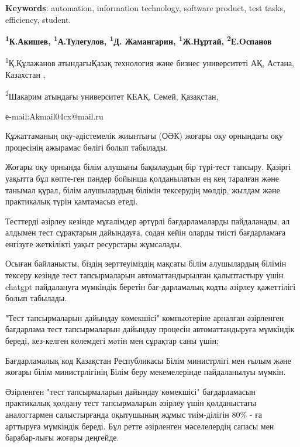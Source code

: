 {\bfseries Keywords}: automation, information technology, software
product, test tasks, efficiency, student.




\begin{center}
{\bfseries \textsuperscript{1}К.Акишев\envelope,
\textsuperscript{1}А.Тулегулов, \textsuperscript{1}Д. Жамангарин,
\textsuperscript{1}Ж.Нұртай, \textsuperscript{2}Е.Oспанов}

\textsuperscript{1}Қ.Құлажанов атындағыҚазақ технология және бизнес
университеті АҚ, Астана, Казахстан ,

\textsuperscript{2}Шакарим атындағы университет КЕАҚ, Семей, Қазақстан,

е-mail:Akmail04cx@mail.ru
\end{center}

Құжаттаманың оқу-әдістемелік жиынтығы (ОӘК) жоғары оқу орнындағы оқу
процесінің ажырамас бөлігі болып табылады.

Жоғары оқу орнында білім алушыны бақылаудың бір түрі-тест тапсыру.
Қазіргі уақытта бұл көпте-ген пәндер бойынша қолданылатын ең кең таралған
және танымал құрал, білім алушылардың білімін тексерудің мөлдір, жылдам
және практикалық түрін қамтамасыз етеді.

Тесттерді әзірлеу кезінде мұғалімдер әртүрлі бағдарламаларды
пайдаланады, ал алдымен тест сұрақтарын дайындауға, содан кейін оларды
тиісті бағдарламаға енгізуге жеткілікті уақыт ресурстары жұмсалады.

Осыған байланысты, біздің зерттеуіміздің мақсаты білім алушылардың
білімін тексеру кезінде тест тапсырмаларын автоматтандырылған
қалыптастыру үшін chatgpt пайдалануға мүмкіндік беретін бағ-дарламалық
кодты әзірлеу қажеттілігі болып табылады.

"Тест тапсырмаларын дайындау көмекшісі" компьютеріне арналған әзірленген
бағдарлама тест тапсырмаларын дайындау процесін автоматтандыруға
мүмкіндік береді, кез-келген көлемдегі мәтін мен сұрақтар саны үшін;

Бағдарламалық код Қазақстан Республикасы Білім министрлігі мен ғылым
және жоғары білім министрлігінің Білім беру мекемелерінде пайдаланылуы
мүмкін.

Әзірленген "тест тапсырмаларын дайындау көмекшісі" бағдарламасын
практикалық қолдану тест тапсырмаларын әзірлеу үшін қолданыстағы
аналогтармен салыстырғанда оқытушының жұмыс тиім-ділігін 80\% - ға
арттыруға мүмкіндік береді. Бұл ретте әзірленген мәселелердің сапасы мен
барабар-лығы жоғары деңгейде.


